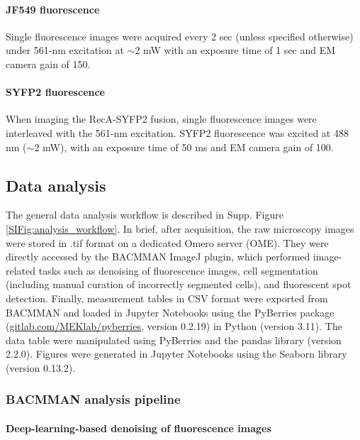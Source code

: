 \paragraph{JF549 fluorescence} Single fluorescence images were acquired every 2 sec (unless specified otherwise) under 561-nm excitation at $\sim$2 mW with an exposure time of 1 sec and EM camera gain of 150.

\paragraph{SYFP2 fluorescence} When imaging the RecA-SYFP2 fusion, single fluorescence images were interleaved with the 561-nm excitation. SYFP2 fluorescence was excited at 488 nm ($\sim$2 mW), with an exposure time of 50 ms and EM camera gain of 100.


\subsection*{Data analysis}
The general data analysis workflow is described in Supp. Figure \ref{SIFig:analysis_workflow}. In brief, after acquisition, the raw microscopy images were stored in .tif format on a dedicated Omero server (OME). They were directly accessed by the BACMMAN ImageJ plugin\cite{}, which performed image-related tasks such as denoising of fluorescence images, cell segmentation (including manual curation of incorrectly segmented cells), and fluorescent spot detection. Finally, measurement tables in CSV format were exported from BACMMAN and loaded in Jupyter Notebooks using the PyBerries package (\href{gitlab.com/MEKlab/pyberries}{gitlab.com/MEKlab/pyberries}, version 0.2.19) in Python (version 3.11). The data table were manipulated using PyBerries and the pandas library (version 2.2.0). Figures were generated in Jupyter Notebooks using the Seaborn library (version 0.13.2).

\subsubsection*{BACMMAN analysis pipeline}
\paragraph*{Deep-learning-based denoising of fluorescence images}

